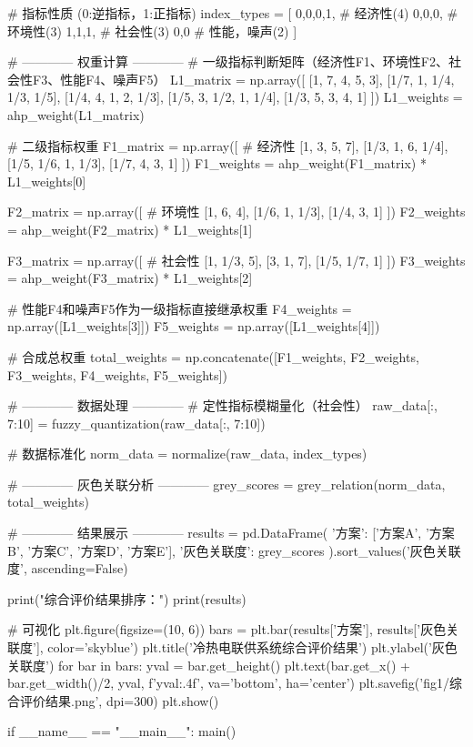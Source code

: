 \documentclass[12pt]{article}
\begin{document}
\begin{python}[language=Python, caption= 全部代码]
    # 指标性质 (0:逆指标，1:正指标)
    index_types = [
        0,0,0,1,   # 经济性(4)
        0,0,0,     # 环境性(3)
        1,1,1,     # 社会性(3)
        0,0        # 性能，噪声(2)
    ]

    # ------------ 权重计算 ------------
    # 一级指标判断矩阵（经济性F1、环境性F2、社会性F3、性能F4、噪声F5）
    L1_matrix = np.array([
        [1, 7, 4, 5, 3],
        [1/7, 1, 1/4, 1/3, 1/5],
        [1/4, 4, 1, 2, 1/3],
        [1/5, 3, 1/2, 1, 1/4],
        [1/3, 5, 3, 4, 1]
    ])
    L1_weights = ahp_weight(L1_matrix)

    # 二级指标权重
    F1_matrix = np.array([  # 经济性
        [1, 3, 5, 7],
        [1/3, 1, 6, 1/4],
        [1/5, 1/6, 1, 1/3],
        [1/7, 4, 3, 1]
    ])
    F1_weights = ahp_weight(F1_matrix) * L1_weights[0]

    F2_matrix = np.array([  # 环境性
        [1, 6, 4],
        [1/6, 1, 1/3],
        [1/4, 3, 1]
    ])
    F2_weights = ahp_weight(F2_matrix) * L1_weights[1]

    F3_matrix = np.array([  # 社会性
        [1, 1/3, 5],
        [3, 1, 7],
        [1/5, 1/7, 1]
    ])
    F3_weights = ahp_weight(F3_matrix) * L1_weights[2]

    # 性能F4和噪声F5作为一级指标直接继承权重
    F4_weights = np.array([L1_weights[3]])
    F5_weights = np.array([L1_weights[4]])

    # 合成总权重
    total_weights = np.concatenate([F1_weights, F2_weights, F3_weights, F4_weights, F5_weights])

    # ------------ 数据处理 ------------
    # 定性指标模糊量化（社会性）
    raw_data[:, 7:10] = fuzzy_quantization(raw_data[:, 7:10])

    # 数据标准化
    norm_data = normalize(raw_data, index_types)

    # ------------ 灰色关联分析 ------------
    grey_scores = grey_relation(norm_data, total_weights)

    # ------------ 结果展示 ------------
    results = pd.DataFrame({
        '方案': ['方案A', '方案B', '方案C', '方案D', '方案E'],
        '灰色关联度': grey_scores
    }).sort_values('灰色关联度', ascending=False)

    print("综合评价结果排序：")
    print(results)

    # 可视化
    plt.figure(figsize=(10, 6))
    bars = plt.bar(results['方案'], results['灰色关联度'], color='skyblue')
    plt.title('冷热电联供系统综合评价结果')
    plt.ylabel('灰色关联度')
    for bar in bars:
        yval = bar.get_height()
        plt.text(bar.get_x() + bar.get_width()/2, yval, f'{yval:.4f}', 
                va='bottom', ha='center')
    plt.savefig('fig1/综合评价结果.png', dpi=300)
    plt.show()

if __name__ == "__main__":
    main()

\end{python}
\end{document}
